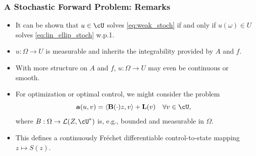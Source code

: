 \documentclass[aspectratio=169,xcolor=dvipsnames,10pt]{beamer}
\begin{document}
\begin{frame}\frametitle{A Stochastic Forward Problem: Remarks}
\begin{block}{}
\begin{itemize}
\item It can be shown that $u \in \cU$ solves \eqref{eq:weak_stoch} if and only if $u(\omega) \in U$ solves \eqref{eq:lin_ellip_stoch} w.p.1.
\item $u : \Omega \to U$ is measurable and inherits the integrability provided by $A$ and $f$.
\item With more structure on $A$ and $f$, $u : \Omega \to U$ may even be continuous or smooth.
\item For optimization or optimal control, we might consider the problem
\[
\mathbf{a}(u,v) = \langle \mathbf{B}(\cdot) z, v \rangle + \mathbf{L}(v) \quad \forall v \in \cU,
\]
where $B : \Omega \to \mathcal{L}(Z, \cU^*)$ is, e.g., bounded and measurable in $\Omega$.
\item This defines a continuously Fr\'echet differentiable control-to-state mapping $z \mapsto S(z)$.
\end{itemize}
\end{block}
\end{frame}

\end{document}
